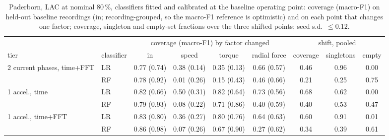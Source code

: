 \begin{table}[tb]\centering\footnotesize
\caption{Paderborn, LAC at nominal 80\,\%, classifiers fitted and calibrated at the baseline operating point: coverage (macro-F1) on held-out baseline recordings (in; recording-grouped, so the macro-F1 reference is optimistic) and on each point that changes one factor; coverage, singleton and empty-set fractions over the three shifted points; seed s.d.\ $\le0.12$.}
\label{tab:factor}
\setlength{\tabcolsep}{3.5pt}\begin{tabular}{llcccc ccc}\hline
 & & \multicolumn{4}{c}{coverage (macro-F1) by factor changed} & \multicolumn{3}{c}{shift, pooled} \\
tier & classifier & in & speed & torque & radial force & coverage & singletons & empty \\ \hline
2 current phases, time+FFT & LR & 0.77 (0.74) & 0.38 (0.14) & 0.35 (0.13) & 0.66 (0.57) & 0.46 & 0.96 & 0.00 \\
 & RF & 0.78 (0.92) & 0.01 (0.26) & 0.15 (0.43) & 0.46 (0.66) & 0.21 & 0.25 & 0.75 \\
1 accel., time & LR & 0.82 (0.66) & 0.50 (0.31) & 0.82 (0.64) & 0.73 (0.56) & 0.68 & 0.62 & 0.00 \\
 & RF & 0.79 (0.93) & 0.08 (0.22) & 0.71 (0.86) & 0.40 (0.59) & 0.40 & 0.53 & 0.47 \\
1 accel., time+FFT & LR & 0.83 (0.80) & 0.36 (0.27) & 0.80 (0.76) & 0.64 (0.63) & 0.60 & 0.91 & 0.01 \\
 & RF & 0.86 (0.98) & 0.07 (0.26) & 0.67 (0.90) & 0.27 (0.62) & 0.34 & 0.39 & 0.61 \\
\hline\end{tabular}\end{table}